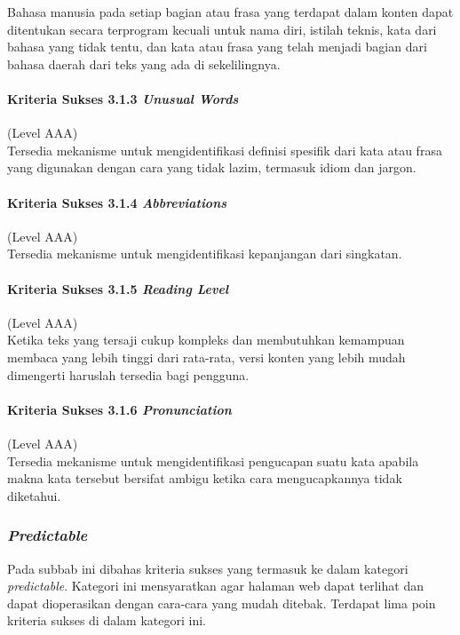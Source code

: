 Bahasa manusia pada setiap bagian atau frasa yang terdapat dalam konten dapat ditentukan secara terprogram kecuali untuk nama diri, istilah teknis, kata dari bahasa yang tidak tentu, dan kata atau frasa yang telah menjadi bagian dari bahasa daerah dari teks yang ada di sekelilingnya.

\paragraph{Kriteria Sukses 3.1.3 \textit{Unusual Words}}
\label{sec:kriteria_sukses_3.1.3}
(Level AAA)\\

Tersedia mekanisme untuk mengidentifikasi definisi spesifik dari kata atau frasa yang digunakan dengan cara yang tidak lazim, termasuk idiom dan jargon.

\paragraph{Kriteria Sukses 3.1.4 \textit{Abbreviations}}
\label{sec:kriteria_sukses_3.1.4}
(Level AAA)\\

Tersedia mekanisme untuk mengidentifikasi kepanjangan dari singkatan.

\paragraph{Kriteria Sukses 3.1.5 \textit{Reading Level}}
\label{sec:kriteria_sukses_3.1.5}
(Level AAA)\\

Ketika teks yang tersaji cukup kompleks dan membutuhkan kemampuan membaca yang lebih tinggi dari rata-rata, versi konten yang lebih mudah dimengerti haruslah tersedia bagi pengguna.

\paragraph{Kriteria Sukses 3.1.6 \textit{Pronunciation}}
\label{sec:kriteria_sukses_3.1.6}
(Level AAA)\\

Tersedia mekanisme untuk mengidentifikasi pengucapan suatu kata apabila makna kata tersebut bersifat ambigu ketika cara mengucapkannya tidak diketahui.

\subsubsection{\textit{Predictable}}
\label{sec:predictable}
Pada subbab ini dibahas kriteria sukses yang termasuk ke dalam kategori \textit{predictable}. Kategori ini mensyaratkan agar halaman web dapat terlihat dan dapat dioperasikan dengan cara-cara yang mudah ditebak. Terdapat lima poin kriteria sukses di dalam kategori ini.

